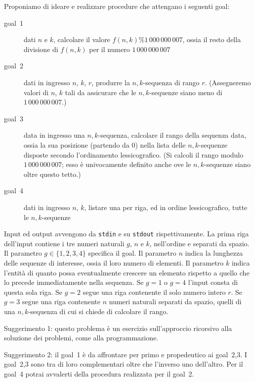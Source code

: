 Proponiamo di ideare e realizzare procedure che attengano i seguenti goal:

\begin{description}
  \item[goal~1] dati $n$ e $k$, calcolare il valore $f(n,k) \% 1\,000\,000\,007$, ossia il resto della divisione di $f(n,k)$ per il numero $1\,000\,000\,007$
  
  \item[goal~2] dati in ingresso $n$, $k$, $r$, produrre la $n,k$-sequenza di rango $r$. (Assegneremo valori di $n$, $k$ tali da assicurare che le $n,k$-sequenze siano meno di $1\,000\,000\,007$.)
  
  \item[goal~3] data in ingresso una $n,k$-sequenza, calcolare il rango della sequenza data, ossia la sua posizione (partendo da $0$) nella lista delle $n,k$-sequenze disposte secondo l'ordinamento lessicografico. (Si calcoli il rango modulo $1\,000\,000\,007$; esso è univocamente definito anche ove le $n,k$-sequenze siano oltre questo tetto.)
  
  \item[goal~4] dati in ingresso $n$, $k$, listare una per riga, ed in ordine lessicografico, tutte le $n,k$-sequenze
    
\end{description}



Input ed output avvengono da \verb'stdin' e su \verb'stdout' rispettivamente.
La prima riga dell'input contiene i tre numeri naturali $g$, $n$ e $k$, nell'ordine e separati da spazio. Il parametro $g\in \{1,2,3,4\}$ specifica il goal. Il parametro $n$ indica la lunghezza delle sequenze di interesse, ossia il loro numero di elementi. Il parametro $k$ indica l'entità di quanto possa eventualmente crescere un elemento rispetto a quello che lo precede immediatamente nella sequenza.
Se $g=1$ o $g=4$ l'input consta di questa sola riga.
Se $g=2$ segue una riga contenente il solo numero intero $r$.
Se $g=3$ segue una riga contenente $n$ numeri naturali separati da spazio, quelli di una $n,k$-sequenza di cui si chiede di calcolare il rango.


Suggerimento 1: questo problema è un esercizio sull'approccio ricorsivo alla soluzione dei problemi, come alla programmazione.

Suggerimento 2: il goal~1 è da affrontare per primo e propedeutico ai goal~2,3. I goal~2,3 sono tra di loro complementari oltre che l'inverso uno dell'altro. Per il goal~4 potrai avvalerti della procedura realizzata per il goal~2.

